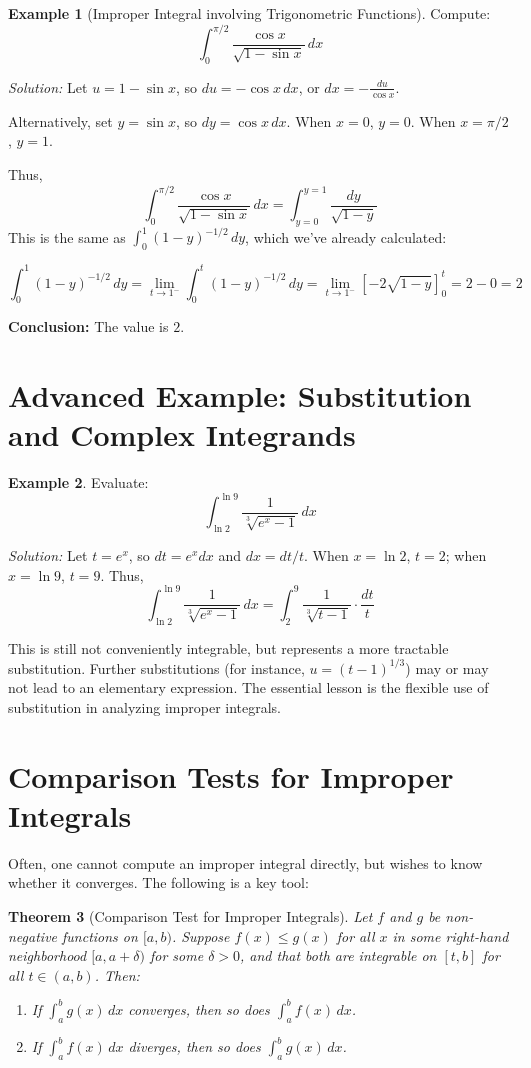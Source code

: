 \documentclass[11pt,oneside]{article}
\newtheorem{theorem}{Theorem}[section]
\theoremstyle{definition}
\newtheorem{example}[theorem]{Example}
\theoremstyle{remark}
\begin{document}
\begin{example}[Improper Integral involving Trigonometric Functions]
Compute:
\[
\int_0^{\pi/2} \frac{\cos x}{\sqrt{1 - \sin x}}\,dx
\]

\textit{Solution:}
Let $u = 1 - \sin x$, so $du = -\cos x\,dx$, or $dx = -\frac{du}{\cos x}$.

Alternatively, set $y = \sin x$, so $dy = \cos x\,dx$. When $x = 0$, $y = 0$. When $x = \pi/2$, $y = 1$.

Thus,
\[
\int_0^{\pi/2} \frac{\cos x}{\sqrt{1 - \sin x}}\,dx = \int_{y=0}^{y=1} \frac{dy}{\sqrt{1 - y}} 
\]
This is the same as $\int_0^1 (1-y)^{-1/2}\,dy$, which we've already calculated:

\[
\int_0^1 (1-y)^{-1/2}\,dy = \lim_{t\to 1^-} \int_0^t (1-y)^{-1/2}\,dy = \lim_{t\to 1^-} \left[-2\sqrt{1-y}\right]_0^t = 2 - 0 = 2
\]

\textbf{Conclusion:} The value is $2$.
\end{example}

\section{Advanced Example: Substitution and Complex Integrands}

\begin{example}
Evaluate:
\[
\int_{\ln 2}^{\ln 9} \frac{1}{\sqrt[3]{e^x-1}}\,dx
\]

\textit{Solution:} Let $t = e^x$, so $dt = e^x dx$ and $dx = dt/t$. When $x = \ln 2$, $t = 2$; when $x = \ln 9$, $t = 9$. Thus,
\[
\int_{\ln 2}^{\ln 9} \frac{1}{\sqrt[3]{e^x-1}}\,dx
 = \int_{2}^{9} \frac{1}{\sqrt[3]{t-1}} \cdot \frac{dt}{t}
\]

This is still not conveniently integrable, but represents a more tractable substitution. Further substitutions (for instance, $u = (t-1)^{1/3}$) may or may not lead to an elementary expression. The essential lesson is the flexible use of substitution in analyzing improper integrals.

\end{example}

\section{Comparison Tests for Improper Integrals}

Often, one cannot compute an improper integral directly, but wishes to know whether it converges. The following is a key tool:

\begin{theorem}[Comparison Test for Improper Integrals]
Let $f$ and $g$ be non-negative functions on $[a, b)$. Suppose $f(x) \leq g(x)$ for all $x$ in some right-hand neighborhood $[a, a+\delta)$ for some $\delta > 0$, and that both are integrable on $[t, b]$ for all $t \in (a,b)$. Then:
\begin{enumerate}
    \item If $\int_a^b g(x)\,dx$ converges, then so does $\int_a^b f(x)\,dx$.
    \item If $\int_a^b f(x)\,dx$ diverges, then so does $\int_a^b g(x)\,dx$.
\end{enumerate}
\end{theorem}
\end{document}
